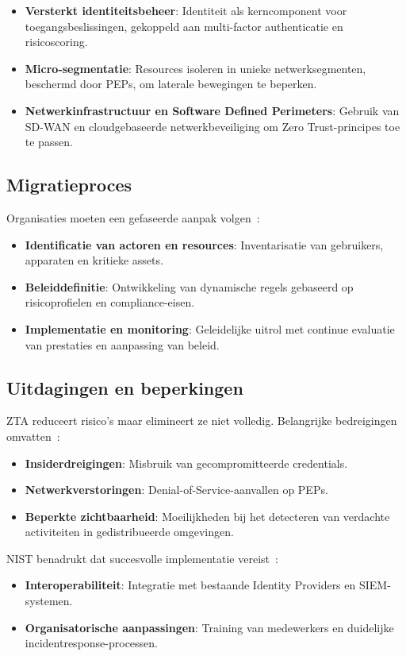 \begin{itemize}
  \item \textbf{Versterkt identiteitsbeheer}: Identiteit als kerncomponent voor toegangsbeslissingen, gekoppeld aan multi-factor authenticatie en risicoscoring.  
  \item \textbf{Micro-segmentatie}: Resources isoleren in unieke netwerksegmenten, beschermd door PEPs, om laterale bewegingen te beperken.  
  \item \textbf{Netwerkinfrastructuur en Software Defined Perimeters}: Gebruik van SD-WAN en cloudgebaseerde netwerkbeveiliging om Zero Trust-principes toe te passen.  
\end{itemize}

\subsection{Migratieproces}
Organisaties moeten een gefaseerde aanpak volgen~\autocite{NIST2020}:  
\begin{itemize}
  \item \textbf{Identificatie van actoren en resources}: Inventarisatie van gebruikers, apparaten en kritieke assets.  
  \item \textbf{Beleiddefinitie}: Ontwikkeling van dynamische regels gebaseerd op risicoprofielen en compliance-eisen.  
  \item \textbf{Implementatie en monitoring}: Geleidelijke uitrol met continue evaluatie van prestaties en aanpassing van beleid.  
\end{itemize}

\subsection{Uitdagingen en beperkingen}
ZTA reduceert risico’s maar elimineert ze niet volledig. Belangrijke bedreigingen omvatten~\autocite{NIST2020}:  
\begin{itemize}
  \item \textbf{Insiderdreigingen}: Misbruik van gecompromitteerde credentials.  
  \item \textbf{Netwerkverstoringen}: Denial-of-Service-aanvallen op PEPs.  
  \item \textbf{Beperkte zichtbaarheid}: Moeilijkheden bij het detecteren van verdachte activiteiten in gedistribueerde omgevingen.  
\end{itemize}

NIST benadrukt dat succesvolle implementatie vereist~\autocite{NIST2020}:  
\begin{itemize}
  \item \textbf{Interoperabiliteit}: Integratie met bestaande Identity Providers en SIEM-systemen.  
  \item \textbf{Organisatorische aanpassingen}: Training van medewerkers en duidelijke incidentresponse-processen.
\end{itemize}

